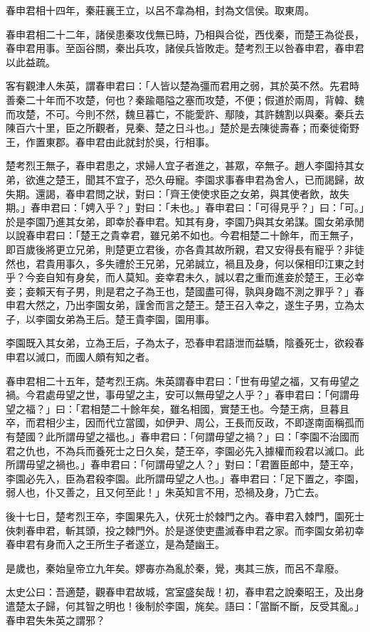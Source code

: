 \begin{pinyinscope}
春申君相十四年，秦莊襄王立，以呂不韋為相，封為文信侯。取東周。

春申君相二十二年，諸侯患秦攻伐無已時，乃相與合從，西伐秦，而楚王為從長，春申君用事。至函谷關，秦出兵攻，諸侯兵皆敗走。楚考烈王以咎春申君，春申君以此益疏。

客有觀津人朱英，謂春申君曰：「人皆以楚為彊而君用之弱，其於英不然。先君時善秦二十年而不攻楚，何也？秦踰黽隘之塞而攻楚，不便；假道於兩周，背韓、魏而攻楚，不可。今則不然，魏旦暮亡，不能愛許、鄢陵，其許魏割以與秦。秦兵去陳百六十里，臣之所觀者，見秦、楚之日斗也。」楚於是去陳徙壽春；而秦徙衛野王，作置東郡。春申君由此就封於吳，行相事。

楚考烈王無子，春申君患之，求婦人宜子者進之，甚眾，卒無子。趙人李園持其女弟，欲進之楚王，聞其不宜子，恐久毋寵。李園求事春申君為舍人，已而謁歸，故失期。還謁，春申君問之狀，對曰：「齊王使使求臣之女弟，與其使者飲，故失期。」春申君曰：「娉入乎？」對曰：「未也。」春申君曰：「可得見乎？」曰：「可。」於是李園乃進其女弟，即幸於春申君。知其有身，李園乃與其女弟謀。園女弟承閒以說春申君曰：「楚王之貴幸君，雖兄弟不如也。今君相楚二十餘年，而王無子，即百歲後將更立兄弟，則楚更立君後，亦各貴其故所親，君又安得長有寵乎？非徒然也，君貴用事久，多失禮於王兄弟，兄弟誠立，禍且及身，何以保相印江東之封乎？今妾自知有身矣，而人莫知。妾幸君未久，誠以君之重而進妾於楚王，王必幸妾；妾賴天有子男，則是君之子為王也，楚國盡可得，孰與身臨不測之罪乎？」春申君大然之，乃出李園女弟，謹舍而言之楚王。楚王召入幸之，遂生子男，立為太子，以李園女弟為王后。楚王貴李園，園用事。

李園既入其女弟，立為王后，子為太子，恐春申君語泄而益驕，陰養死士，欲殺春申君以滅口，而國人頗有知之者。

春申君相二十五年，楚考烈王病。朱英謂春申君曰：「世有毋望之福，又有毋望之禍。今君處毋望之世，事毋望之主，安可以無毋望之人乎？」春申君曰：「何謂毋望之福？」曰：「君相楚二十餘年矣，雖名相國，實楚王也。今楚王病，旦暮且卒，而君相少主，因而代立當國，如伊尹、周公，王長而反政，不即遂南面稱孤而有楚國？此所謂毋望之福也。」春申君曰：「何謂毋望之禍？」曰：「李園不治國而君之仇也，不為兵而養死士之日久矣，楚王卒，李園必先入據權而殺君以滅口。此所謂毋望之禍也。」春申君曰：「何謂毋望之人？」對曰：「君置臣郎中，楚王卒，李園必先入，臣為君殺李園。此所謂毋望之人也。」春申君曰：「足下置之，李園，弱人也，仆又善之，且又何至此！」朱英知言不用，恐禍及身，乃亡去。

後十七日，楚考烈王卒，李園果先入，伏死士於棘門之內。春申君入棘門，園死士俠刺春申君，斬其頭，投之棘門外。於是遂使吏盡滅春申君之家。而李園女弟初幸春申君有身而入之王所生子者遂立，是為楚幽王。

是歲也，秦始皇帝立九年矣。嫪毐亦為亂於秦，覺，夷其三族，而呂不韋廢。

太史公曰：吾適楚，觀春申君故城，宮室盛矣哉！初，春申君之說秦昭王，及出身遣楚太子歸，何其智之明也！後制於李園，旄矣。語曰：「當斷不斷，反受其亂。」春申君失朱英之謂邪？


\end{pinyinscope}
